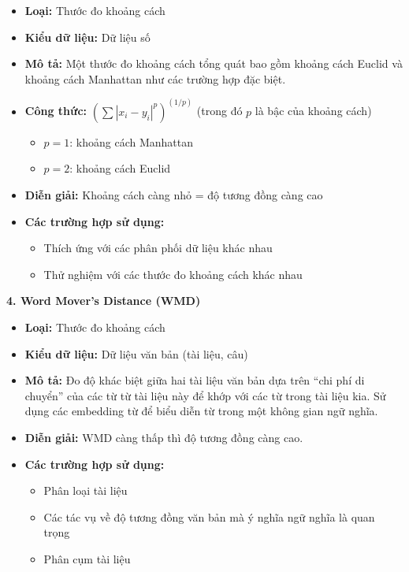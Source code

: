 \begin{itemize}
  \item \textbf{Loại:} Thước đo khoảng cách
  \item \textbf{Kiểu dữ liệu:} Dữ liệu số
  \item \textbf{Mô tả:} Một thước đo khoảng cách tổng quát bao gồm khoảng cách Euclid và khoảng cách Manhattan như các trường hợp đặc biệt.
  \item \textbf{Công thức:} $(\sum |x_i - y_i|^p)^{(1/p)}$ (trong đó $p$ là bậc của khoảng cách)
  \begin{itemize}
    \item $p = 1$: khoảng cách Manhattan
    \item $p = 2$: khoảng cách Euclid
  \end{itemize}
  \item \textbf{Diễn giải:} Khoảng cách càng nhỏ = độ tương đồng càng cao
  \item \textbf{Các trường hợp sử dụng:}
  \begin{itemize}
    \item Thích ứng với các phân phối dữ liệu khác nhau
    \item Thử nghiệm với các thước đo khoảng cách khác nhau
  \end{itemize}
\end{itemize}

\textbf{4. Word Mover's Distance (WMD)}

\begin{itemize}
  \item \textbf{Loại:} Thước đo khoảng cách
  \item \textbf{Kiểu dữ liệu:} Dữ liệu văn bản (tài liệu, câu)
  \item \textbf{Mô tả:} Đo độ khác biệt giữa hai tài liệu văn bản dựa trên ``chi phí di chuyển'' của các từ từ tài liệu này để khớp với các từ trong tài liệu kia. Sử dụng các embedding từ để biểu diễn từ trong một không gian ngữ nghĩa.
  \item \textbf{Diễn giải:} WMD càng thấp thì độ tương đồng càng cao.
  \item \textbf{Các trường hợp sử dụng:}
  \begin{itemize}
    \item Phân loại tài liệu
    \item Các tác vụ về độ tương đồng văn bản mà ý nghĩa ngữ nghĩa là quan trọng
    \item Phân cụm tài liệu
  \end{itemize}
\end{itemize}

